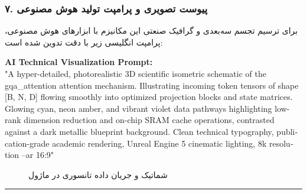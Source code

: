 \subsubsection*{۷. پیوست تصویری و پرامپت تولید هوش مصنوعی}
برای ترسیم تجسم سه‌بعدی و گرافیک صنعتی این مکانیزم با ابزارهای هوش مصنوعی، پرامپت انگلیسی زیر با دقت تدوین شده است:

\vspace{0.2cm}
\begin{latin}
\footnotesize
\textbf{AI Technical Visualization Prompt:}\\
"A hyper-detailed, photorealistic 3D scientific isometric schematic of the gqa\_attention attention mechanism. Illustrating incoming token tensors of shape [B, N, D] flowing smoothly into optimized projection blocks and state matrices. Glowing cyan, neon amber, and vibrant violet data pathways highlighting low-rank dimension reduction and on-chip SRAM cache operations, contrasted against a dark metallic blueprint background. Clean technical typography, publication-grade academic rendering, Unreal Engine 5 cinematic lighting, 8k resolution --ar 16:9"
\end{latin}

\begin{figure}[H]
    \centering
    \caption{شماتیک و جریان داده تانسوری در ماژول }
    \label{fig:gqa_attention}
\end{figure}

\vspace{0.5cm}
\hrule
\vspace{0.5cm}
